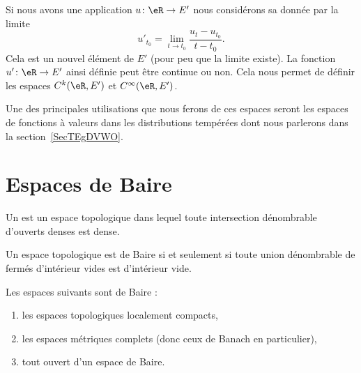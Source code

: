 \begin{definition}  \label{DefDZsypWu}
    Si nous avons une application \( u\colon \eR\to E'\) nous considérons sa  donnée par la limite
    \begin{equation}
        u'_{t_0}=\lim_{t\to t_0} \frac{ u_t-u_{t_0} }{ t-t_0 }.
    \end{equation}
    Cela est un nouvel élément de \( E'\) (pour peu que la limite existe). La fonction \( u'\colon \eR\to E'\) ainsi définie peut être continue ou non. Cela nous permet de définir les espaces \( C^k(\eR,E')\) et \( C^{\infty}(\eR,E')\).
\end{definition}
Une des principales utilisations que nous ferons de ces espaces seront les espaces de fonctions à valeurs dans les distributions tempérées dont nous parlerons dans la section~\ref{SecTEgDVWO}.

\section{Espaces de Baire}
\label{SecBDlaUrz}

\begin{definition}
    Un  est un espace topologique dans lequel toute intersection dénombrable d'ouverts denses est dense.
\end{definition}

\begin{lemma}       \label{LEMooTOJDooQDtWUC}
    Un espace topologique est de Baire si et seulement si toute union dénombrable de fermés d'intérieur vides est d'intérieur vide.
\end{lemma}

\begin{theorem}    \label{ThoBBIljNM}
    Les espaces suivants sont de Baire :
    \begin{enumerate}
        \item
            les espaces topologiques localement compacts,
        \item
            les espaces métriques complets (donc ceux de Banach en particulier),
        \item
            tout ouvert d'un espace de Baire.
    \end{enumerate}
\end{theorem}

